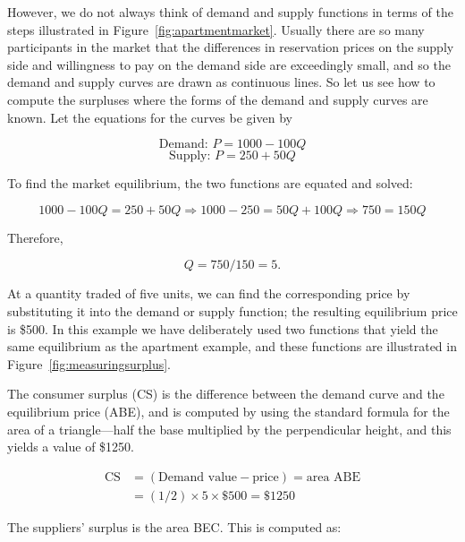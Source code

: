 However, we do not always think of demand and supply functions in terms of the steps illustrated in Figure~\ref{fig:apartmentmarket}. Usually there are so many participants in the market that the differences in reservation prices on the supply side and willingness to pay on the demand side are exceedingly small, and so the demand and supply curves are drawn as continuous lines. So let us see how to compute the surpluses where the forms of the demand and supply curves are known. Let the equations for the curves be given by

\begin{equation*}
\text{Demand: }P=1000-100Q
\end{equation*}
\begin{equation*}
\text{Supply: }P=250+50Q
\end{equation*}

To find the market equilibrium, the two functions are equated and solved:

\begin{equation*}
1000-100Q=250+50Q\Rightarrow 1000-250=50Q+100Q\Rightarrow 750=150Q
\end{equation*}

Therefore,

\begin{equation*}
Q = 750/150 = 5.
\end{equation*}

At a quantity traded of five units, we can find the corresponding price by substituting it into the demand or supply function; the resulting equilibrium price is \$500. In this example we have deliberately used two functions that yield the same equilibrium as the apartment example, and these functions are illustrated in Figure~\ref{fig:measuringsurplus}. 



The consumer surplus (CS) is the difference between the demand curve and the equilibrium price (ABE), and is computed by using the standard formula for the area of a triangle---half the base multiplied by the perpendicular height, and this yields a value of \$1250. 

\begin{align*}
\text{CS}	&=(\text{Demand value}-\text{price})=\text{area ABE}	\\
					&=(1/2)\times 5\times \$500=\$ 1250
\end{align*}

The suppliers' surplus is the area BEC. This is computed as: 

